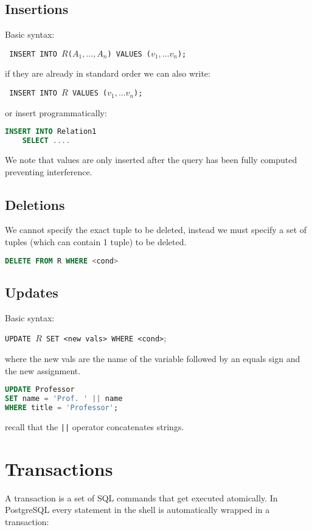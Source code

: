 \documentclass{article}
\renewcommand{\t}[1]{\texttt{#1}}
\begin{document}
\subsection*{Insertions}

Basic syntax:

\texttt{
INSERT INTO $R$($A_1,\ldots,A_n$) VALUES ($v_1,\ldots v_n$);
}

if they are already in standard order we can also write:

\texttt{
	INSERT INTO $R$ VALUES ($v_1,\ldots v_n$);
}

or insert programmatically:

\begin{lstlisting}[language=SQL]
INSERT INTO Relation1
	SELECT ....
\end{lstlisting}

We note that values are only inserted after the query has been fully computed preventing interference.

\subsection*{Deletions}
We cannot specify the exact tuple to be deleted, instead we must specify a set of tuples (which can contain 1 tuple) to be deleted.
\begin{lstlisting}[language=SQL]
DELETE FROM R WHERE <cond>
\end{lstlisting}

\subsection*{Updates}
Basic syntax:

\texttt{UPDATE $R$ SET <new vals> WHERE <cond>};

where the new vals are the name of the variable followed by an equals sign and the new assignment. 
\begin{lstlisting}[language=SQL]
UPDATE Professor
SET name = 'Prof. ' || name
WHERE title = 'Professor';
\end{lstlisting}
recall that the \t{||} operator concatenates strings.


\section*{Transactions}


A transaction is a set of SQL commands that get executed atomically. In PostgreSQL every statement in the shell is automatically wrapped in a transaction:
\end{document}
